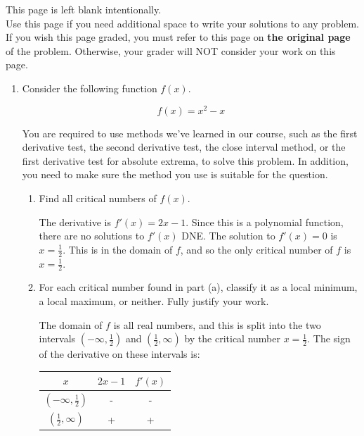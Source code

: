 \documentclass[11pt]{article}
\begin{document}
{    }

\vfill


\newpage

This page is left blank intentionally.\\

Use this page if you need additional space to write your solutions to any problem. \\

If you wish this page graded, you must refer to this page on \textbf{the original page} of the problem. Otherwise, your grader will NOT consider your work on this page.

\newpage%


\begin{enumerate}


\item Consider the following function $f(x)$.

\[f(x)=x^2 - x\]%


You are required to use methods we've learned in our course, such as the first derivative test, the second derivative test, the close interval method, or the first derivative test for absolute extrema, to solve this problem. In addition, you need to make sure the method you use is suitable for the question.

\begin{enumerate}
    \item Find all critical numbers of $f(x)$.
\smallskip

{\color{blue}
The derivative is \( f'(x) = 2x-1 \). Since this is a polynomial function, there are no solutions to \( f'(x) \) DNE. The solution to \( f'(x) = 0 \) is \( x = \frac{1}{2} \). This is in the domain of \( f \), and so the only critical number of \( f \) is \( x = \frac{1}{2} \).

}
\bigskip    

    \item For each critical number found in part (a), classify it as a local minimum, a local maximum, or neither. Fully justify your work.
\smallskip

{\color{blue}
The domain of \( f \) is all real numbers, and this is split into the two intervals \( (-\infty, \frac{1}{2}) \) and \( (\frac{1}{2}, \infty) \) by the critical number \( x = \frac{1}{2} \). The sign of the derivative on these intervals is:
\begin{table}[h!]
    \centering
    \begin{tabular}{c|c|c}
      $x$  & $2x-1$ & $f'(x)$\\
      \hline
        $(-\infty, \frac{1}{2})$ & -  & - \\
        $(\frac{1}{2}, \infty)$ & +  &  + \\
    \end{tabular}
\end{table}

}
\end{enumerate}
\end{enumerate}
\end{document}

